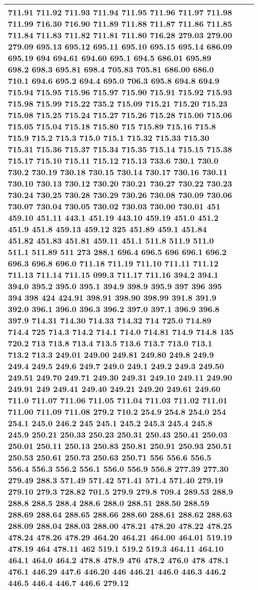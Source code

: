 \begin{longtable}{|R{.05in}|L{.5in}||L{5.75in}|}
711.91 711.92 711.93 711.94 711.95 711.96 711.97 711.98 711.99 716.30 716.90 711.89 711.88 711.87 711.86 711.85 711.84 711.83 711.82 711.81 711.80 716.28 279.03 279.00 279.09 695.13 695.12 695.11 695.10 695.15 695.14 686.09 695.19 694 694.61 694.60 695.1 694.5 686.01 695.89 698.2 698.3 695.81 698.4 705.83 705.81 686.00 686.0 710.1 694.6 695.2 694.4 695.0 706.3 695.8 694.8 694.9 715.94 715.95 715.96 715.97 715.90 715.91 715.92 715.93 715.98 715.99 715.22 735.2 715.09 715.21 715.20 715.23 715.08 715.25 715.24 715.27 715.26 715.28 715.00 715.06 715.05 715.04 715.18 715.80 715 715.89 715.16 715.8 715.9 715.2 715.3 715.0 715.1 715.32 715.33 715.30 715.31 715.36 715.37 715.34 715.35 715.14 715.15 715.38 715.17 715.10 715.11 715.12 715.13 733.6 730.1 730.0 730.2 730.19 730.18 730.15 730.14 730.17 730.16 730.11 730.10 730.13 730.12 730.20 730.21 730.27 730.22 730.23 730.24 730.25 730.28 730.29 730.26 730.08 730.09 730.06 730.07 730.04 730.05 730.02 730.03 730.00 730.01 451 459.10 451.11 443.1 451.19 443.10 459.19 451.0 451.2 451.9 451.8 459.13 459.12 325 451.89 459.1 451.84 451.82 451.83 451.81 459.11 451.1 511.8 511.9 511.0 511.1 511.89 511 273 288.1 696.4 696.5 696 696.1 696.2 696.3 696.8 696.0 711.18 711.19 711.10 711.11 711.12 711.13 711.14 711.15 099.3 711.17 711.16 394.2 394.1 394.0 395.2 395.0 395.1 394.9 398.9 395.9 397 396 395 394 398 424 424.91 398.91 398.90 398.99 391.8 391.9 392.0 396.1 396.0 396.3 396.2 397.0 397.1 396.9 396.8 397.9 714.31 714.30 714.33 714.32 714 725.0 714.89 714.4 725 714.3 714.2 714.1 714.0 714.81 714.9 714.8 135 720.2 713 713.8 713.4 713.5 713.6 713.7 713.0 713.1 713.2 713.3 249.01 249.00 249.81 249.80 249.8 249.9 249.4 249.5 249.6 249.7 249.0 249.1 249.2 249.3 249.50 249.51 249.70 249.71 249.30 249.31 249.10 249.11 249.90 249.91 249 249.41 249.40 249.21 249.20 249.61 249.60 711.0 711.07 711.06 711.05 711.04 711.03 711.02 711.01 711.00 711.09 711.08 279.2 710.2 254.9 254.8 254.0 254 254.1 245.0 246.2 245 245.1 245.2 245.3 245.4 245.8 245.9 250.21 250.33 250.23 250.31 250.43 250.41 250.03 250.01 250.11 250.13 250.83 250.81 250.91 250.93 250.51 250.53 250.61 250.73 250.63 250.71 556 556.6 556.5 556.4 556.3 556.2 556.1 556.0 556.9 556.8 277.39 277.30 279.49 288.3 571.49 571.42 571.41 571.4 571.40 279.19 279.10 279.3 728.82 701.5 279.9 279.8 709.4 289.53 288.9 288.8 288.5 288.4 288.6 288.0 288.51 288.50 288.59 288.69 288.64 288.65 288.66 288.60 288.61 288.62 288.63 288.09 288.04 288.03 288.00 478.21 478.20 478.22 478.25 478.24 478.26 478.29 464.20 464.21 464.00 464.01 519.19 478.19 464 478.11 462 519.1 519.2 519.3 464.11 464.10 464.1 464.0 464.2 478.8 478.9 476 478.2 476.0 478 478.1 476.1 446.29 447.6 446.20 446 446.21 446.0 446.3 446.2 446.5 446.4 446.7 446.6 279.12\\\hline

\end{longtable}
